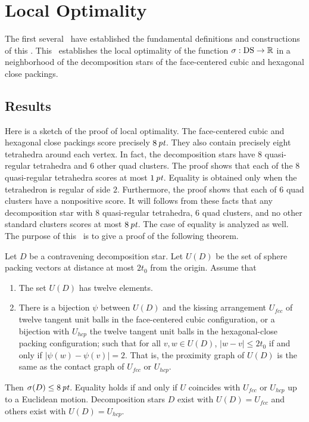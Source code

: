 

\chapter{Local Optimality}
\label{sec:local-opt}

The first several \chaps\  have established the
fundamental definitions and constructions of this \paper.   This
\chap\ establishes the local optimality of the function
$\sigma:{\operatorname{DS}}\to\mathbb{R}$ in a neighborhood of the decomposition
stars of the face-centered cubic and hexagonal close packings.

\section{Results}

Here is a sketch of the proof of local optimality.  The
face-centered cubic and hexagonal close packings score precisely
$8\,\hbox{\it pt}$.  They also contain precisely eight tetrahedra around each
vertex.  In fact, the decomposition stars have $8$ quasi-regular
tetrahedra and $6$ other quad clusters.   The proof shows that each
of the $8$ quasi-regular tetrahedra scores at most $1\,\hbox{\it pt}$.
Equality is obtained only when the tetrahedron is regular of side
$2$. Furthermore, the proof shows that each of $6$ quad clusters
have a nonpositive score.   It will follows from these facts that
any decomposition star with $8$ quasi-regular tetrahedra, $6$ quad
clusters, and no other standard clusters scores at most $8\,\hbox{\it pt}$.
The case of equality is analyzed as well. The purpose of this \chap\
is to give a proof of the following theorem.

\begin{theorem} [Local Optimality] \label{lemma:local-optimality}
Let $D$ be a contravening decomposition star.  Let $U(D)$ be the
set of sphere packing vectors at distance at most $2t_0$ from the
origin.
%
Assume that
   \begin{enumerate}
      \item The set $U(D)$
         has twelve elements.
      \item There is a bijection $\psi$ between $U(D)$ and the kissing
         arrangement $U_{fcc}$ of twelve tangent unit balls in
         the face-centered cubic configuration, or a bijection
            with $U_{hcp}$ the twelve tangent unit balls in the
            hexagonal-close packing configuration;
            such that
            for all $v,w\in U(D)$, $|w-v|\le 2t_0$ if and only if
            $|\psi(w)-\psi(v)|=2$.  That is, the proximity
            graph of $U(D)$ is the same as the contact graph of
               $U_{fcc}$ or $U_{hcp}$.
   \end{enumerate}
Then $\sigma(D)\le 8\,\hbox{\it pt}$.  Equality holds if and only if
   $U$ coincides with $U_{fcc}$ or $U_{hcp}$ up to a Euclidean
   motion.  Decomposition stars $D$ exist with $U(D)=U_{fcc}$ and
   others exist with $U(D) = U_{hcp}$.
\end{theorem}

